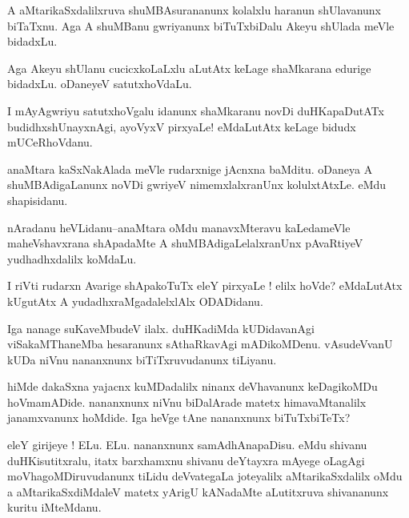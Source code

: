 \documentclass{article}
\begin{document}
\begin{mn}%
A aMtarikaSxdalilxruva shuMBAsurananunx kolalxlu haranun shUlavanunx biTaTxnu. Aga A 
shuMBanu gwriyanunx biTuTxbiDalu Akeyu shUlada meVle bidadxLu.
\end{mn}

\begin{mn}%
Aga Akeyu shUlanu cucicxkoLaLxlu aLutAtx keLage shaMkarana edurige bidadxLu. oDaneyeV 
satutxhoVdaLu.
\end{mn}

\begin{mn}%
I mAyAgwriyu satutxhoVgalu idanunx shaMkaranu novDi duHKapaDutATx budidhxshUnayxnAgi, 
ayoVyxV pirxyaLe! eMdaLutAtx keLage bidudx mUCeRhoVdanu.
\end{mn}

\begin{mn}%
anaMtara kaSxNakAlada meVle rudarxnige jAcnxna baMditu. oDaneya A shuMBAdigaLanunx noVDi 
gwriyeV nimemxlalxranUnx kolulxtAtxLe. eMdu shapisidanu.
\end{mn}

\begin{mn}%
nAradanu heVLidanu--anaMtara oMdu manavxMteravu kaLedameVle maheVshavxrana shApadaMte A 
shuMBAdigaLelalxranUnx pAvaRtiyeV yudhadhxdalilx koMdaLu.
\end{mn}

\begin{mn}%
I riVti rudarxn Avarige shApakoTuTx eleY pirxyaLe ! elilx hoVde? eMdaLutAtx kUgutAtx A 
yudadhxraMgadalelxlAlx ODADidanu.
\end{mn}

\begin{mn}%
Iga nanage suKaveMbudeV ilalx. duHKadiMda kUDidavanAgi viSakaMThaneMba hesaranunx 
sAthaRkavAgi mADikoMDenu. vAsudeVvanU kUDa niVnu nananxnunx biTiTxruvudanunx tiLiyanu.
\end{mn}

\begin{mn}%
hiMde dakaSxna yajacnx kuMDadalilx ninanx deVhavanunx keDagikoMDu hoVmamADide. nananxnunx 
niVnu biDalArade matetx himavaMtanalilx janamxvanunx hoMdide. Iga heVge tAne nananxnunx 
biTuTxbiTeTx?
\end{mn}

\begin{mn}%
eleY girijeye ! ELu. ELu. nananxnunx samAdhAnapaDisu. eMdu shivanu duHKisutitxralu, itatx 
barxhamxnu shivanu deYtayxra mAyege oLagAgi moVhagoMDiruvudanunx tiLidu deVvategaLa 
joteyalilx aMtarikaSxdalilx oMdu a aMtarikaSxdiMdaleV matetx yArigU kANadaMte aLutitxruva 
shivananunx kuritu iMteMdanu.
\end{mn}
\end{document}
